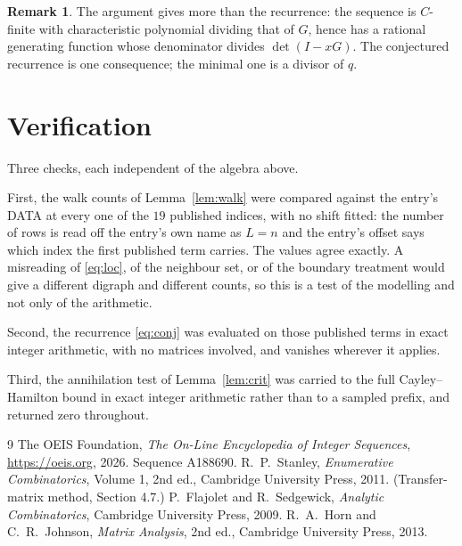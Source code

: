 \documentclass[11pt,a4paper]{article}
\theoremstyle{plain}
\theoremstyle{definition}
\newtheorem{remark}[theorem]{Remark}
\begin{document}
\begin{remark}
The argument gives more than the recurrence: the sequence is $C$-finite with characteristic
polynomial dividing that of $G$, hence has a rational generating function whose denominator
divides $\det(I-xG)$. The conjectured recurrence is one consequence; the minimal one is a
divisor of $q$.
\end{remark}

\section{Verification}

Three checks, each independent of the algebra above.

First, the walk counts of Lemma~\ref{lem:walk} were compared against the entry's DATA at
every one of the $19$ published indices, with no shift fitted: the number of rows is
read off the entry's own name as $L=n$ and the entry's offset says which index the first
published term carries. The values agree exactly. A misreading of \eqref{eq:loc}, of the
neighbour set, or of the boundary treatment would give a different digraph and different
counts, so this is a test of the modelling and not only of the arithmetic.

Second, the recurrence \eqref{eq:conj} was evaluated on those published terms in exact
integer arithmetic, with no matrices involved, and vanishes wherever it applies.

Third, the annihilation test of Lemma~\ref{lem:crit} was carried to the full
Cayley--Hamilton bound in exact integer arithmetic rather than to a sampled prefix, and
returned zero throughout.

\begin{thebibliography}{9}
 The OEIS Foundation, \emph{The On-Line Encyclopedia of Integer
Sequences}, \url{https://oeis.org}, 2026. Sequence A188690.
 R.~P.~Stanley, \emph{Enumerative Combinatorics}, Volume 1, 2nd ed.,
Cambridge University Press, 2011. (Transfer-matrix method, Section 4.7.)
 P.~Flajolet and R.~Sedgewick, \emph{Analytic Combinatorics}, Cambridge
University Press, 2009.
 R.~A.~Horn and C.~R.~Johnson, \emph{Matrix Analysis}, 2nd ed., Cambridge
University Press, 2013.
\end{thebibliography}
\end{document}

